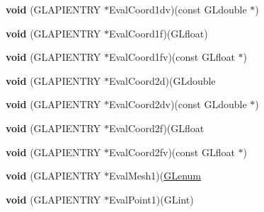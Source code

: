 \begin{DoxyCompactItemize}
\item 
\mbox{\label{struct_____g_ldispatch_table_rec_a03e50df1060cab91f9efd38d783c22c5}} 
{\bfseries void} (G\+L\+A\+P\+I\+E\+N\+T\+RY $\ast$Eval\+Coord1dv)(const G\+Ldouble $\ast$)
\item 
\mbox{\label{struct_____g_ldispatch_table_rec_ad9c73cfa8e758984dff84ee0740691e8}} 
{\bfseries void} (G\+L\+A\+P\+I\+E\+N\+T\+RY $\ast$Eval\+Coord1f)(G\+Lfloat)
\item 
\mbox{\label{struct_____g_ldispatch_table_rec_a02a3153a3088c97f94e6e414a781d487}} 
{\bfseries void} (G\+L\+A\+P\+I\+E\+N\+T\+RY $\ast$Eval\+Coord1fv)(const G\+Lfloat $\ast$)
\item 
\mbox{\label{struct_____g_ldispatch_table_rec_a9061aec711e277416ae6bba8832af51e}} 
{\bfseries void} (G\+L\+A\+P\+I\+E\+N\+T\+RY $\ast$Eval\+Coord2d)(G\+Ldouble
\item 
\mbox{\label{struct_____g_ldispatch_table_rec_af4ac8ad93ed01d157ffa01db11389212}} 
{\bfseries void} (G\+L\+A\+P\+I\+E\+N\+T\+RY $\ast$Eval\+Coord2dv)(const G\+Ldouble $\ast$)
\item 
\mbox{\label{struct_____g_ldispatch_table_rec_a0beec712f45d575ce71afa38c55e6f40}} 
{\bfseries void} (G\+L\+A\+P\+I\+E\+N\+T\+RY $\ast$Eval\+Coord2f)(G\+Lfloat
\item 
\mbox{\label{struct_____g_ldispatch_table_rec_a1b03796e02a00a8c6f203ff7bc8a6d37}} 
{\bfseries void} (G\+L\+A\+P\+I\+E\+N\+T\+RY $\ast$Eval\+Coord2fv)(const G\+Lfloat $\ast$)
\item 
\mbox{\label{struct_____g_ldispatch_table_rec_a10fcbacceb6b3a9e33102d34f4ccd251}} 
{\bfseries void} (G\+L\+A\+P\+I\+E\+N\+T\+RY $\ast$Eval\+Mesh1)(\hyperlink{interfacevoid}{G\+Lenum}
\item 
\mbox{\label{struct_____g_ldispatch_table_rec_a7f199e9ee9c2319b41c5e3b46ae9475c}} 
{\bfseries void} (G\+L\+A\+P\+I\+E\+N\+T\+RY $\ast$Eval\+Point1)(G\+Lint)

\end{DoxyCompactItemize}
